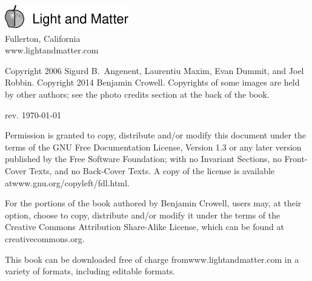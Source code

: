 \thispagestyle{empty}

\vspace{100mm}

\noindent
\includegraphics{cover/lmlogo}\\
Fullerton, California\\
www.lightandmatter.com

\vspace{20mm}
\noindent
Copyright 2006 Sigurd B.~Angenent, Laurentiu Maxim, Evan Dummit, and Joel Robbin.
Copyright 2014 Benjamin Crowell.
Copyrights of some images are held by other authors; see the photo credits section
at the back of the book.

\vspace{20mm}
\noindent
rev. \today{}

\vspace{6mm}
\noindent
Permission is granted to copy, distribute and/or
modify this document under the terms of the GNU Free Documentation License, Version
1.3 or any later version published by the Free Software Foundation; with no Invariant
Sections, no Front-Cover Texts, and no Back-Cover Texts. A copy of the license is
available at\linebreak[4]
www.gnu.org/copyleft/fdl.html.

For the portions of the book authored by Benjamin Crowell, users may, at their option,
choose to copy, distribute and/or modify it
under the terms of the Creative Commons Attribution
Share-Alike License, which can be found at creativecommons.org.

This book can be downloaded free of charge
from\linebreak[4]
www.lightandmatter.com in a variety of formats,
including editable formats.
